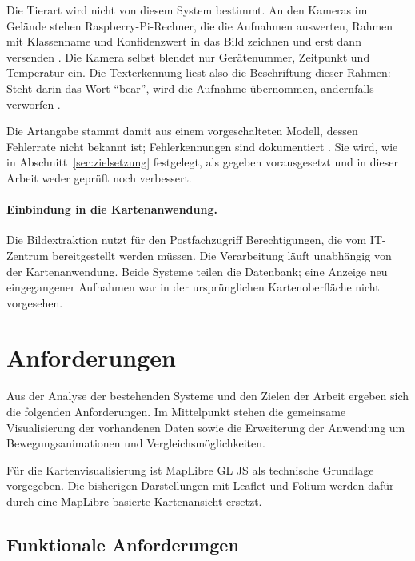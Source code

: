 \documentclass[12pt,a4paper]{report}
\begin{document}
Die Tierart wird nicht von diesem System bestimmt. An den Kameras im Gelände stehen
Raspberry-Pi-Rechner, die die Aufnahmen auswerten, Rahmen mit Klassenname und
Konfidenzwert in das Bild zeichnen und erst dann versenden \cite[S.~8]{LelchatBA}. Die
Kamera selbst blendet nur Gerätenummer, Zeitpunkt und Temperatur ein. Die Texterkennung
liest also die Beschriftung dieser Rahmen: Steht darin das Wort \enquote{bear}, wird die
Aufnahme übernommen, andernfalls verworfen \cite[S.~20]{LelchatBA}.

Die Artangabe stammt damit aus einem vorgeschalteten Modell, dessen Fehlerrate nicht bekannt
ist; Fehlerkennungen sind dokumentiert \cite[S.~24]{LelchatBA}. Sie wird, wie in
Abschnitt~\ref{sec:zielsetzung} festgelegt, als gegeben vorausgesetzt und in dieser Arbeit
weder geprüft noch verbessert.

\paragraph{Einbindung in die Kartenanwendung.}

Die Bildextraktion nutzt für den Postfachzugriff Berechtigungen, die vom IT-Zentrum
bereitgestellt werden müssen. Die Verarbeitung läuft unabhängig von der Kartenanwendung.
Beide Systeme teilen die Datenbank; eine Anzeige neu eingegangener Aufnahmen war in der
ursprünglichen Kartenoberfläche nicht vorgesehen.


\section{Anforderungen}
\label{sec:anforderungen}

Aus der Analyse der bestehenden Systeme und den Zielen der Arbeit
ergeben sich die folgenden Anforderungen. Im Mittelpunkt stehen die
gemeinsame Visualisierung der vorhandenen Daten sowie die Erweiterung
der Anwendung um Bewegungsanimationen und Vergleichsmöglichkeiten.

Für die Kartenvisualisierung ist MapLibre GL JS als technische
Grundlage vorgegeben. Die bisherigen Darstellungen mit
Leaflet und Folium werden dafür durch eine MapLibre-basierte Kartenansicht ersetzt.

\subsection{Funktionale Anforderungen}
\end{document}
